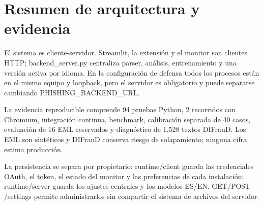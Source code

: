 \documentclass[11pt,a4paper,oneside]{report}
\begin{document}
\chapter{Resumen de arquitectura y evidencia}

El sistema es cliente-servidor. Streamlit, la extensión y el monitor son clientes HTTP; backend\_server.py centraliza parser, análisis, entrenamiento y una versión activa por idioma. En la configuración de defensa todos los procesos están en el mismo equipo y loopback, pero el servidor es obligatorio y puede separarse cambiando PHISHING\_BACKEND\_URL.

La evidencia reproducible comprende 94 pruebas Python, 2 recorridos con Chromium, integración continua, benchmark, calibración separada de 40 casos, evaluación de 16 EML reservados y diagnóstico de 1.528 textos DIFrauD. Los EML son sintéticos y DIFrauD conserva riesgo de solapamiento; ninguna cifra estima producción.

La persistencia se separa por propietario: runtime/client guarda las credenciales OAuth, el token, el estado del monitor y las preferencias de cada instalación; runtime/server guarda los ajustes centrales y los modelos ES/EN. GET/POST /settings permite administrarlos sin compartir el sistema de archivos del servidor.
\end{document}
